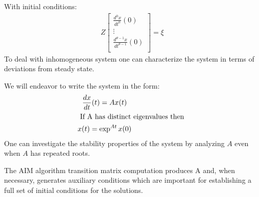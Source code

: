 \documentclass[1p]{elsarticle}
\begin{document}
With initial conditions:
\begin{gather*}
  Z 
  \begin{bmatrix}
    \frac{d^0x}{dt^0}(0)\\
\vdots\\
    \frac{d^{\theta-1}x}{dt^{\theta-1}}(0)\\
  \end{bmatrix}= \xi
\end{gather*}
To deal with inhomogeneous system one can characterize the system in terms of
deviations from steady state.

We will endeavor to write the system in the form:\cite{bellman70}
\begin{gather*}
  \frac{dx}{dt}(t) = A x(t) \\ \intertext{ If A has distinct eigenvalues then }
x(t)= \exp^{A t} x(0)
\end{gather*}
One can investigate the stability properties of the system by
analyzing $A$ even when $A$ has repeated roots.

The AIM algorithm transition matrix computation 
produces A and, when necessary,
 generates auxiliary conditions which are important for
establishing a full set of initial conditions for the solutions.\cite{ANDER:AIM97}
\end{document}
